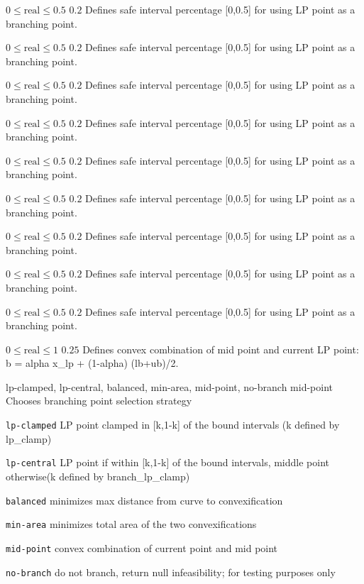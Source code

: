 %
{$0\leq\textrm{real}\leq0.5$}%
{$0.2$}%
{Defines safe interval percentage [0,0.5] for using LP point as a branching point.}%
{}

%
{$0\leq\textrm{real}\leq0.5$}%
{$0.2$}%
{Defines safe interval percentage [0,0.5] for using LP point as a branching point.}%
{}

%
{$0\leq\textrm{real}\leq0.5$}%
{$0.2$}%
{Defines safe interval percentage [0,0.5] for using LP point as a branching point.}%
{}

%
{$0\leq\textrm{real}\leq0.5$}%
{$0.2$}%
{Defines safe interval percentage [0,0.5] for using LP point as a branching point.}%
{}

%
{$0\leq\textrm{real}\leq0.5$}%
{$0.2$}%
{Defines safe interval percentage [0,0.5] for using LP point as a branching point.}%
{}

%
{$0\leq\textrm{real}\leq0.5$}%
{$0.2$}%
{Defines safe interval percentage [0,0.5] for using LP point as a branching point.}%
{}

%
{$0\leq\textrm{real}\leq0.5$}%
{$0.2$}%
{Defines safe interval percentage [0,0.5] for using LP point as a branching point.}%
{}

%
{$0\leq\textrm{real}\leq0.5$}%
{$0.2$}%
{Defines safe interval percentage [0,0.5] for using LP point as a branching point.}%
{}

%
{$0\leq\textrm{real}\leq0.5$}%
{$0.2$}%
{Defines safe interval percentage [0,0.5] for using LP point as a branching point.}%
{}

%
{$0\leq\textrm{real}\leq1$}%
{$0.25$}%
{Defines convex combination of mid point and current LP point: b = alpha x\_lp + (1-alpha) (lb+ub)/2.}%
{}

%
{lp-clamped, lp-central, balanced, min-area, mid-point, no-branch}%
{mid-point}%
{Chooses branching point selection strategy}%
{\begin{list}{}{
\setlength{\parsep}{0em}
\setlength{\leftmargin}{5ex}
\setlength{\labelwidth}{2ex}
\setlength{\itemindent}{0ex}
\setlength{\topsep}{0pt}}
\item[\texttt{lp-clamped}] LP point clamped in [k,1-k] of the bound intervals (k defined by lp\_clamp)
\item[\texttt{lp-central}] LP point if within [k,1-k] of the bound intervals, middle point otherwise(k defined by branch\_lp\_clamp)
\item[\texttt{balanced}] minimizes max distance from curve to convexification
\item[\texttt{min-area}] minimizes total area of the two convexifications
\item[\texttt{mid-point}] convex combination of current point and mid point
\item[\texttt{no-branch}] do not branch, return null infeasibility; for testing purposes only
\end{list}
}

